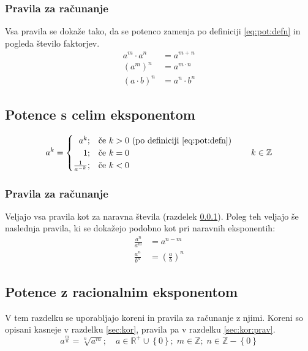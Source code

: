 \documentclass[a4paper,oneside,12pt,fleqn]{article}
\def\R{\ensuremath{\mathbb R}}
\def\Z{\ensuremath{\mathbb Z}}
\newcommand\krat\cdot
\numberwithin{equation}{section}
\begin{document}
\subsubsection{Pravila za računanje}
\label{sec:pot:nar:prav}
Vsa pravila se dokaže tako, da se potenco zamenja po definiciji \eqref{eq:pot:defn} in
pogleda število faktorjev.
\begin{align}
  a^m \krat a^n &= a^{m+n} \label{eq:pot:anankratanam} \\
  (a^m)^n &= a^{m\krat n} \label{eq:pot:anannam} \\
  (a\krat b)^n &= a^n \krat b^n \label{eq:pot:akratbnan}
\end{align}

\subsection{Potence s celim eksponentom}
\label{sec:pot:cela}
\begin{equation}
  \label{eq:pot:defz}
  a^k =
  \begin{cases}
    \hfill a^k; & \text{če $k > 0$ (po definiciji \eqref{eq:pot:defn})} \\
    \hfill 1;   & \text{če $k = 0$} \\
    \hfill \frac{1}{a^{-k}}; & \text{če $k < 0$}
  \end{cases}
  \qquad k \in \Z
\end{equation}


\subsubsection{Pravila za računanje}
\label{sec:pot:cela:prav}
Veljajo vsa pravila kot za naravna števila (razdelek \ref{sec:pot:nar:prav}). Poleg teh veljajo še
naslednja pravila, ki se dokažejo podobno kot pri naravnih eksponentih:
\begin{align}
  \frac{a^n}{a^m} &= a^{n-m} \label{eq:pot:anandelanam} \\
  \frac{a^n}{b^n} &= \left( \frac{a}{b} \right)^n
\end{align}

\subsection{Potence z racionalnim eksponentom}
\label{sec:pot:rac}
V tem razdelku se uporabljajo koreni in pravila za računanje z njimi. Koreni so opisani
kasneje v razdelku \ref{sec:kor}, pravila pa v razdelku \ref{sec:kor:prav}.
\begin{equation}
  \label{eq:pot:defrac}
  a^{\frac{m}{n}} = \sqrt[n]{a^m}; \quad a \in \R^+ \cup \left\{ 0 \right\}; \; m \in \Z;
  \; n \in \Z - \left\{ 0 \right\}
\end{equation}
\end{document}

